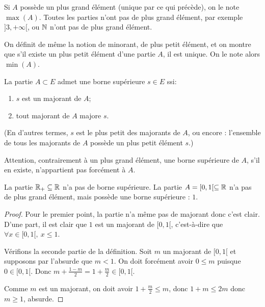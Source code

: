 Si $A$ possède un plus grand élément (unique par ce qui précède), on le note $\max(A)$. Toutes les parties n'ont pas de plus grand élément, par exemple $]3,+\infty[$, ou $\mathbb{N}$ n'ont pas de plus grand élément.


On définit de même  la notion de minorant, de plus petit élément, et on montre que s'il existe un plus petit élément d'une partie $A$, il est unique. On le note alors $\min(A)$.

\begin{definition} La partie $A\subset E$ admet une borne supérieure $s\in E$ ssi:
\begin{enumerate}
\item $s$ est un majorant de $A$;
\item tout majorant de $A$ majore $s$.
\end{enumerate}
(En d'autres termes, $s$ est le plus petit des majorants de $A$, ou encore : l'ensemble de tous les majorants de $A$ possède un plus petit élément $s$.)
\end{definition}

Attention, contrairement à un plus grand élément, une  borne supérieure de $A$, s'il en existe, n'appartient pas forcément à $A$. 
\begin{exemple}
La partie $\mathbb{R}_+ \subseteq \mathbb{R}$ n'a pas de borne supérieure. 
La partie $A=[0,1[ \subseteq \mathbb{R}$ n'a pas de plus grand élément, mais possède une borne supérieure : $1$.
\end{exemple}
\begin{proof} Pour le premier point, la partie n'a même pas de majorant donc c'est clair. 
D'une part, il est clair que $1$ est un majorant de $[0,1[$, c'est-à-dire que $\forall x\in [0,1[, \: x\leq 1$.

Vérifions la seconde partie de la définition.  Soit $m$ un majorant de $[0,1[$ et supposons par l'absurde que $m < 1$. On doit forcément avoir $0\leq m$ puisque $0\in [0,1[$. Donc $m+\frac{1-m}{2}=1+\frac{m}{2} \in [0,1[$.
\begin{center}
\end{center}

 Comme $m$ est un majorant, on doit avoir $1+\frac{m}{2}\leq m$, donc $1+m\leq 2m$ donc $m\geq 1$, absurde.
\end{proof}

